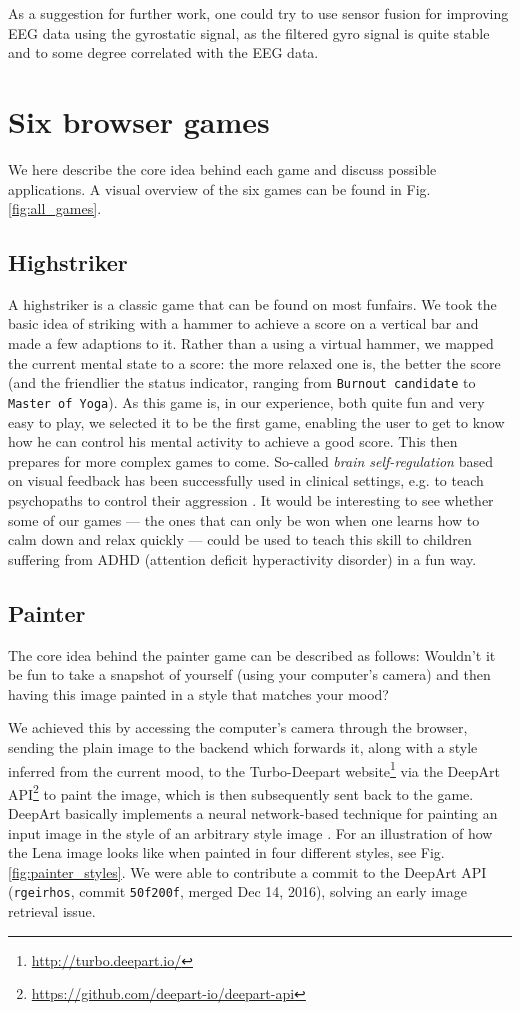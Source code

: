 \documentclass{utue} %
\begin{document}
As a suggestion for further work, one could try to use sensor fusion for improving EEG data using the gyrostatic signal, as the filtered gyro signal is quite stable and to some degree correlated with the EEG data.

\section{Six browser games}
We here describe the core idea behind each game and discuss possible applications. A visual overview of the six games can be found in Fig. \ref{fig:all_games}.

\subsection{Highstriker}
A highstriker is a classic game that can be found on most funfairs. We took the basic idea of striking with a hammer to achieve a score on a vertical bar and made a few adaptions to it. Rather than a using a virtual hammer, we mapped the current mental state to a score: the more relaxed one is, the better the score (and the friendlier the status indicator, ranging from \texttt{Burnout candidate} to \texttt{Master of Yoga}). As this game is, in our experience, both quite fun and very easy to play, we selected it to be the first game, enabling the user to get to know how he can control his mental activity to achieve a good score. This then prepares for more complex games to come. So-called \textit{brain self-regulation} based on visual feedback has been successfully used in clinical settings, e.g. to teach psychopaths to control their aggression \cite{Konicar2015}. It would be interesting to see whether some of our games --- the ones that can only be won when one learns how to calm down and relax quickly --- could be used to teach this skill to children suffering from ADHD (attention deficit hyperactivity disorder) in a fun way.

\subsection{Painter}
The core idea behind the painter game can be described as follows: Wouldn't it be fun to take a snapshot of yourself (using your computer's camera) and then having this image painted in a style that matches your mood? 

We achieved this by accessing the computer's camera through the browser, sending the plain image to the backend which forwards it, along with a style inferred from the current mood, to the Turbo-Deepart website\footnote{\url{http://turbo.deepart.io/}} via the DeepArt API\footnote{\url{https://github.com/deepart-io/deepart-api}} to paint the image, which is then subsequently sent back to the game. DeepArt basically implements a neural network-based technique for painting an input image in the style of an arbitrary style image \cite{Gatys2016}. For an illustration of how the Lena image looks like when painted in four different styles, see Fig. \ref{fig:painter_styles}. We were able to contribute a commit to the DeepArt API (\texttt{rgeirhos}, commit \texttt{50f200f}, merged Dec 14, 2016), solving an early image retrieval issue.
\end{document}
